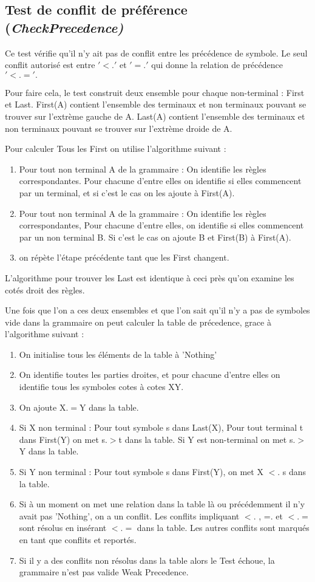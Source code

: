 	\subsection{Test de conflit de préférence (\emph{CheckPrecedence)}}
		Ce test vérifie qu'il n'y ait pas de conflit entre les précédence
		de symbole. Le seul conflit autorisé est entre $'<.'$ et $'=.'$ qui donne
		la relation de précédence $'<.='.$

		Pour faire cela, le test construit deux ensemble pour chaque non-terminal :
		First et Last. First(A) contient l'ensemble des terminaux et non terminaux 
		pouvant se trouver sur l'extrème gauche de A. Last(A) contient l'ensemble
		des terminaux et non terminaux pouvant se trouver sur l'extrème droide de A. 

		Pour calculer Tous les First on utilise l'algorithme suivant :
		\begin{enumerate}
			\item Pour tout non terminal A de la grammaire : On identifie les règles correspondantes.
			Pour chacune d'entre elles on identifie si elles commencent par un terminal, et si
			c'est le cas on les ajoute à First(A).
			\item Pour tout non terminal A de la grammaire : On identifie les règles correspondantes,
			Pour chacune d'entre elles, on identifie si elles commencent par un non terminal B.
			Si c'est le cas on ajoute B et First(B) à First(A). 
			\item on répète l'étape précédente tant que les First changent.
		\end{enumerate}
		L'algorithme pour trouver les Last est identique à ceci près qu'on examine les cotés droit des règles.
		
		Une fois que l'on a ces deux ensembles et que l'on sait qu'il n'y a pas de symboles vide dans
		la grammaire on  peut calculer la table de précedence, grace à l'algorithme suivant :
		\begin{enumerate}
			\item On initialise tous les éléments de la table à 'Nothing'
			\item On identifie toutes les parties droites, et pour chacune d'entre elles on identifie tous les
			symboles cotes à cotes XY.
			\item On ajoute X$.=$Y dans la table.
			\item Si X non terminal : Pour tout symbole s dans Last(X), Pour tout terminal t dans First(Y)
				on met s$.>$t dans la table. Si Y est non-terminal on met s$.>$Y dans la table.
			\item Si Y non terminal : Pour tout symbole s dans First(Y), on met X $<.$ s dans la table.
			\item Si à un moment on met une relation dans la table là ou précédemment il n'y avait pas 'Nothing',
				on a un conflit. Les conflits impliquant $<.$ , =. et $<.=$ sont résolus en insérant $<.=$ dans
				la table. Les autres conflits sont marqués en tant que conflits et reportés. 
			\item Si il y a des conflits non résolus dans la table alors le Test échoue, la grammaire n'est pas valide
			Weak Precedence.
		\end{enumerate}
